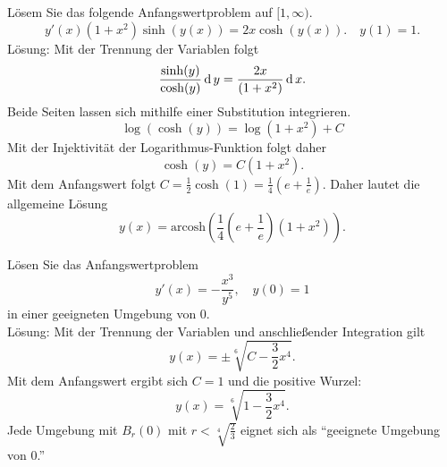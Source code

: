 \documentclass[parskip=full]{scrartcl}
\begin{document}
Lösem Sie das folgende Anfangswertproblem auf $[1, \infty)$.
\begin{displaymath}
  y'(x)(1 + x^2) \sinh(y(x)) = 2x \cosh(y(x)). \quad y(1) = 1.
\end{displaymath}
Lösung: Mit der Trennung der Variablen folgt
\begin{displaymath}
  \frac{\sinh(y)}{\cosh(y)} \operatorname{\mathop{}\!\mathrm{d}} y = \frac{2x}{(1 + x^2)} \operatorname{\mathop{}\!\mathrm{d}} x.
\end{displaymath}
Beide Seiten lassen sich mithilfe einer Substitution integrieren.
\begin{displaymath}
  \log(\cosh(y)) = \log(1 + x^2) + C
\end{displaymath}
Mit der Injektivität der Logarithmus-Funktion folgt daher
\begin{displaymath}
  \cosh(y) = C(1 + x^2).
\end{displaymath}
Mit dem Anfangswert folgt $C = \frac{1}{2} \cosh(1) = \frac{1}{4}\left(e + \frac{1}{e}\right)$.
Daher lautet die allgemeine Lösung
\begin{displaymath}
  y(x) = \text{arcosh}\left(\frac{1}{4}(e + \frac{1}{e})(1 + x^2)\right).
\end{displaymath}

Lösen Sie das Anfangswertproblem 
\begin{displaymath}
  y'(x) = -\frac{x^3}{y^5}, \quad y(0) = 1
\end{displaymath}
in einer geeigneten Umgebung von 0.\\
Lösung: 
Mit der Trennung der Variablen und anschließender Integration gilt
\begin{displaymath}
  y(x) = \pm \sqrt[6]{C - \frac{3}{2}x^4}.
\end{displaymath}
Mit dem Anfangswert ergibt sich $C = 1$ und die positive Wurzel:
\begin{displaymath}
  y(x) = \sqrt[6]{1 - \frac{3}{2}x^4}.
\end{displaymath}
Jede Umgebung mit $B_r(0)$ mit $r < \sqrt[4]{\frac{2}{3}}$ eignet sich als ``geeignete Umgebung von 0.''
\end{document}
